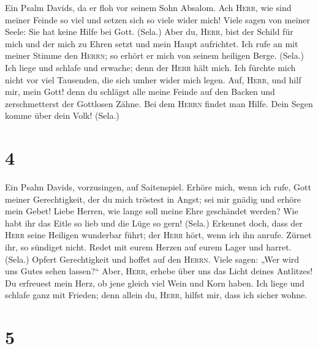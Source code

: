  Ein Psalm Davids, da er floh vor seinem Sohn Absalom.
 Ach \textsc{Herr}, wie sind meiner Feinde so viel und
setzen sich so viele wider mich!  Viele sagen von meiner
Seele: Sie hat keine Hilfe bei Gott. (Sela.)  Aber du,
\textsc{Herr}, bist der Schild für mich und der mich zu Ehren setzt und
mein Haupt aufrichtet.  Ich rufe an mit meiner Stimme den
\textsc{Herrn}; so erhört er mich von seinem heiligen Berge. (Sela.)
 Ich liege und schlafe und erwache; denn der \textsc{Herr}
hält mich.  Ich fürchte mich nicht vor viel Tausenden, die
sich umher wider mich legen.  Auf, \textsc{Herr}, und hilf
mir, mein Gott! denn du schlägst alle meine Feinde auf den Backen und
zerschmetterst der Gottlosen Zähne.  Bei dem
\textsc{Herrn} findet man Hilfe. Dein Segen komme über dein Volk!
(Sela.)

\hypertarget{section-3}{%
\section{4}\label{section-3}}

 Ein Psalm Davids, vorzusingen, auf Saitenspiel.
 Erhöre mich, wenn ich rufe, Gott meiner Gerechtigkeit,
der du mich tröstest in Angst; sei mir gnädig und erhöre mein Gebet!
 Liebe Herren, wie lange soll meine Ehre geschändet
werden? Wie habt ihr das Eitle so lieb und die Lüge so gern! (Sela.)
 Erkennet doch, dass der \textsc{Herr} seine Heiligen
wunderbar führt; der \textsc{Herr} hört, wenn ich ihn anrufe.
 Zürnet ihr, so sündiget nicht. Redet mit eurem Herzen auf
eurem Lager und harret. (Sela.)  Opfert Gerechtigkeit und
hoffet auf den \textsc{Herrn}.  Viele sagen: „Wer wird uns
Gutes sehen lassen?{}`` Aber, \textsc{Herr}, erhebe über uns das Licht
deines Antlitzes!  Du erfreuest mein Herz, ob jene gleich
viel Wein und Korn haben.  Ich liege und schlafe ganz mit
Frieden; denn allein du, \textsc{Herr}, hilfst mir, dass ich sicher
wohne.

\hypertarget{section-4}{%
\section{5}\label{section-4}}

